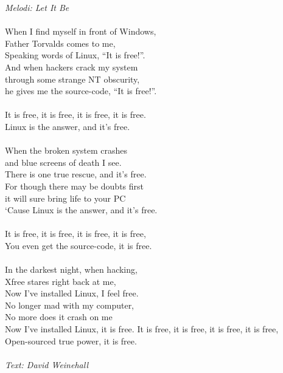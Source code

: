 {\footnotesize\textit{Melodi: Let It Be}}\\
\\
When I find myself in front of Windows,\\
Father Torvalds comes to me,\\
Speaking words of Linux, ``It is free!''.\\
And when hackers crack my system\\
through some strange NT obscurity,\\
he gives me the source-code, ``It is free!''.\\
\\
It is free, it is free, it is free, it is free.\\
Linux is the answer, and it's free.\\
\\
When the broken system crashes\\
and blue screens of death I see.\\
There is one true rescue, and it's free.\\
For though there may be doubts first\\
it will sure bring life to your PC\\
`Cause Linux is the answer, and it's free.\\
\\
It is free, it is free, it is free, it is free,\\
You even get the source-code, it is free.\\
\\
In the darkest night, when hacking,\\
Xfree stares right back at me,\\
Now I've installed Linux, I feel free.\\
No longer mad with my computer,\\
No more does it crash on me\\
Now I've installed Linux, it is free.
\newpage
It is free, it is free, it is free, it is free,\\
Open-sourced true power, it is free.\\
\\
{\footnotesize\textit{Text: David Weinehall}}
